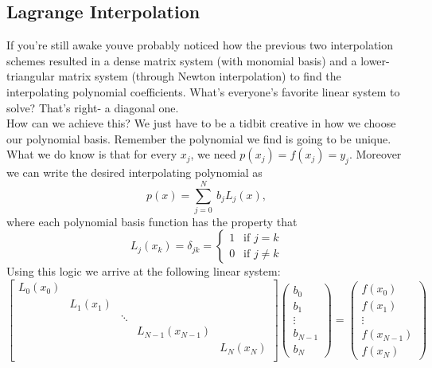 \documentclass[paper=a4, fontsize=11pt]{scrartcl} %
\numberwithin{equation}{section} %
\numberwithin{figure}{section} %
\numberwithin{table}{section} %
\begin{document}
%
%
% 
%
%
%
\subsection{Lagrange Interpolation}

$ $\\

If you're still awake youve probably noticed how the previous two interpolation schemes resulted in a dense matrix system (with monomial basis) and a lower-triangular matrix system (through Newton interpolation) to find the interpolating polynomial coefficients. What's everyone's favorite linear system to solve? That's right-  a diagonal one. \\

How can we achieve this? We just have to be a tidbit creative in how we choose our polynomial basis. Remember the polynomial we find is going to be unique. What we do know is that for every $x_j$, we need $p(x_j) = f(x_j)=y_j$. Moreover we can write the desired interpolating polynomial as $$p(x) = \sum_{j=0}^{N} \ b_j L_{j}(x),$$ where each polynomial basis function has the property that $$L_{j}(x_k) = \delta_{jk} = \left\{ \begin{array}{c} 1 \ \ \mbox{ if } j=k \\   0\ \ \mbox{ if } j\neq k \end{array} \right. $$ Using this logic we arrive at the following linear system: \\

$$\left[ \begin{array}{ccccc}
L_0(x_0) 	&  	            & 	              &   		   	  &  \\
                  & L_1(x_1)  &                  &   		   	  & \\
                  & 	            & \ddots     &                   		  & \\
	         & 	            &  		   &  L_{N-1}(x_{N-1})  &  \\
         	        &		  & 		   &  				  & L_N(x_N) \\ 
\end{array} \right] %
%
\left( \begin{array}{c}
b_{0} \\
b_{1} \\
\vdots \\
b_{N-1} \\
b_{N}
\end{array} \right) =  
%
\left( \begin{array}{c}
f(x_0) \\
f(x_1) \\
\vdots \\
f(x_{N-1}) \\
f(x_{N})
\end{array} \right)$$\\
\end{document}

